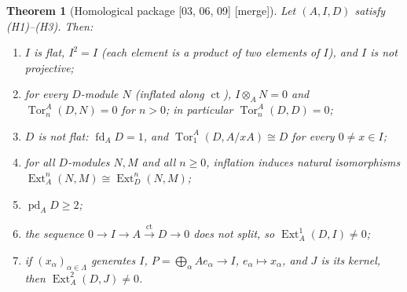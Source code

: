 \documentclass[11pt,letterpaper]{article}
\numberwithin{equation}{section}
\newtheorem{theorem}{Theorem}[section]
\theoremstyle{definition}
\theoremstyle{remark}
\theoremstyle{plain}
\newcommand{\ct}{\operatorname{ct}}
\newcommand{\Tor}{\operatorname{Tor}}
\newcommand{\Ext}{\operatorname{Ext}}
\newcommand{\pd}{\operatorname{pd}}
\newcommand{\fd}{\operatorname{fd}}
\newcommand{\src}[1]{\textup{\textsf{[#1]}}}
\newcommand{\merge}{\textup{\textsf{[merge]}}}
\begin{document}
\begin{theorem}[Homological package \src{03, 06, 09} \merge]\label{osq:thm:homological}
Let $(A,I,D)$ satisfy (H1)--(H3). Then:
\begin{enumerate}
\item $I$ is flat, $I^2=I$ (each element is a product of two elements of $I$), and $I$ is not projective;
\item for every $D$-module $N$ (inflated along $\ct$), $I\otimes_AN=0$ and $\Tor^A_n(D,N)=0$ for
$n>0$; in particular $\Tor^A_n(D,D)=0$;
\item $D$ is not flat: $\fd_AD=1$, and $\Tor^A_1(D,A/xA)\cong D$ for every $0\ne x\in I$;
\item for all $D$-modules $N,M$ and all $n\ge0$, inflation induces natural isomorphisms
$\Ext^n_A(N,M)\cong\Ext^n_D(N,M)$;
\item $\pd_AD\ge2$;
\item the sequence $0\to I\to A\xrightarrow{\ct}D\to0$ does not split, so $\Ext^1_A(D,I)\ne0$;
\item if $(x_\alpha)_{\alpha\in\Lambda}$ generates $I$, $P=\bigoplus_{\alpha}Ae_\alpha\to I$,
$e_\alpha\mapsto x_\alpha$, and $J$ is its kernel, then $\Ext^2_A(D,J)\ne0$.
\end{enumerate}
\end{theorem}
\end{document}

